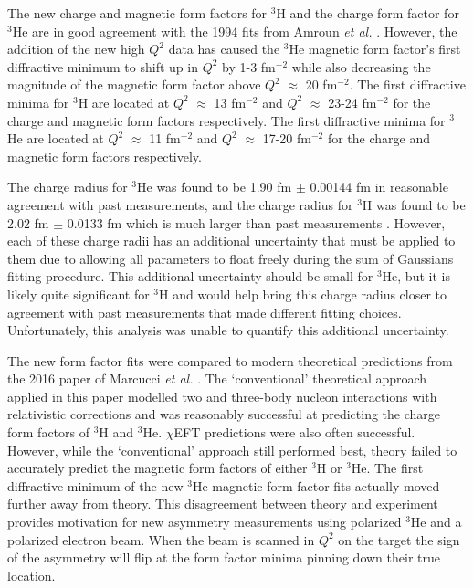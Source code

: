 \documentclass[../main.tex]{subfiles}
\begin{document}
\begin{singlespace}
{{}

{\parindent0pt %

\indent The new charge and magnetic form factors for $^3$H and the charge form factor for $^3$He are in good agreement with the 1994 fits from Amroun \textit{et al.} \cite{Article:Amroun}. However, the addition of the new high $Q^2$ data has caused the $^3$He magnetic form factor's first diffractive minimum to shift up in $Q^2$ by 1-3 fm$^{-2}$ while also decreasing the magnitude of the magnetic form factor above $Q^2$ $\approx$ 20 fm$^{-2}$. The first diffractive minima for $^3$H are located at $Q^2$ $\approx$ 13 fm$^{-2}$ and $Q^2$ $\approx$ 23-24 fm$^{-2}$ for the charge and magnetic form factors respectively. The first diffractive minima for $^3$He are located at $Q^2$ $\approx$ 11 fm$^{-2}$ and $Q^2$ $\approx$ 17-20 fm$^{-2}$ for the charge and magnetic form factors respectively. \\

}

{\parindent0pt %

\indent The charge radius for $^3$He was found to be 1.90 fm $\pm$ 0.00144 fm in reasonable agreement with past measurements, and the charge radius for $^3$H was found to be 2.02 fm $\pm$ 0.0133 fm which is much larger than past measurements \cite{3h_proposal}. However, each of these charge radii has an additional uncertainty that must be applied to them due to allowing all parameters to float freely during the sum of Gaussians fitting procedure. This additional uncertainty should be small for $^3$He, but it is likely quite significant for $^3$H and would help bring this charge radius closer to agreement with past measurements that made different fitting choices. Unfortunately, this analysis was unable to quantify this additional uncertainty. \\

}

{\parindent0pt %

\indent The new form factor fits were compared to modern theoretical predictions from the 2016 paper of Marcucci \textit{et al.} \cite{Article:Marcucci}. The `conventional' theoretical approach applied in this paper modelled two and three-body nucleon interactions with relativistic corrections and was reasonably successful at predicting the charge form factors of $^3$H and $^3$He. $\chi$EFT predictions were also often successful. However, while the `conventional' approach still performed best, theory failed to accurately predict the magnetic form factors of either $^3$H or $^3$He. The first diffractive minimum of the new $^3$He magnetic form factor fits actually moved further away from theory. This disagreement between theory and experiment provides motivation for new asymmetry measurements using polarized $^3$He and a polarized electron beam. When the beam is scanned in $Q^2$ on the target the sign of the asymmetry will flip at the form factor minima pinning down their true location.

}

}
\end{singlespace}
\end{document}
